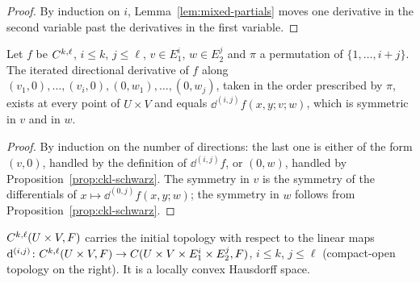 \begin{proof}
  \leanok
  By induction on $i$, Lemma~\ref{lem:mixed-partials} moves one derivative in the second
  variable past the derivatives in the first variable.
\end{proof}

\begin{proposition}
  \label{prop:ckl-schwarz-general}
  \leanok
  Let $f$ be $C^{k,\ell}$, $i \leq k$, $j \leq \ell$, $v \in E_1^i$, $w \in E_2^j$ and
  $\pi$ a permutation of $\{1, \ldots, i + j\}$. The iterated directional derivative of $f$ along
  $(v_1, 0), \ldots, (v_i, 0), (0, w_1), \ldots, (0, w_j)$, taken in the order prescribed by
  $\pi$, exists at every point of $U \times V$ and equals $\dd^{(i,j)} f(x, y; v; w)$, which is
  symmetric in $v$ and in $w$.
\end{proposition}

\begin{proof}
  \leanok
  By induction on the number of directions: the last one is either of the form $(v, 0)$, handled
  by the definition of $\dd^{(i,j)} f$, or $(0, w)$, handled by Proposition~\ref{prop:ckl-schwarz}.
  The symmetry in $v$ is the symmetry of the differentials of $x \mapsto \dd^{(0,j)} f(x, y; w)$;
  the symmetry in $w$ follows from Proposition~\ref{prop:ckl-schwarz}.
\end{proof}

\begin{definition}
  \label{def:ckl-topology}
  \leanok
  $C^{k,\ell}(U \times V, F)$ carries the initial topology with respect to the linear maps
  $\mathrm{d}^{(i,j)} \colon C^{k,\ell}(U \times V, F) \to C(U \times V \times E_1^i \times E_2^j, F)$,
  $i \leq k$, $j \leq \ell$ (compact-open topology on the right). It is a locally convex
  Hausdorff space.
\end{definition}

